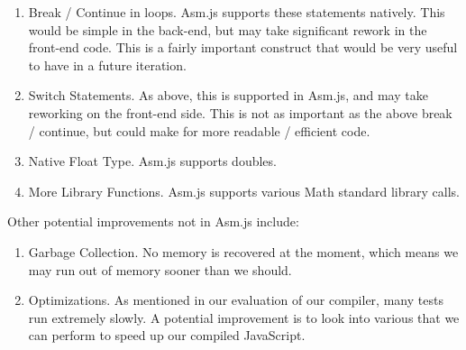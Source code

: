 \documentclass[twoside]{article}
\begin{document}
\begin{multicols}{2}
\begin{enumerate}
  \item Break / Continue in loops. Asm.js supports these statements natively.
    This would be simple in the back-end, but may take significant rework in the
    front-end code. This is a fairly important construct that would be very useful
    to have in a future iteration.
  \item Switch Statements. As above, this is supported in Asm.js, and may take
    reworking on the front-end side. This is not as important as the above break
    / continue, but could make for more readable / efficient code.
  \item Native Float Type. Asm.js supports doubles.
  \item More Library Functions. Asm.js supports various Math standard library
    calls.
\end{enumerate}

Other potential improvements not in Asm.js include:

\begin{enumerate}
  \item Garbage Collection. No memory is recovered at the moment, which means
    we may run out of memory sooner than we should.
  \item Optimizations. As mentioned in our evaluation of our compiler, many tests
    run extremely slowly. A potential improvement is to look into various
    that we can perform to speed up our compiled JavaScript.
\end{enumerate}


\end{multicols}
\end{document}
